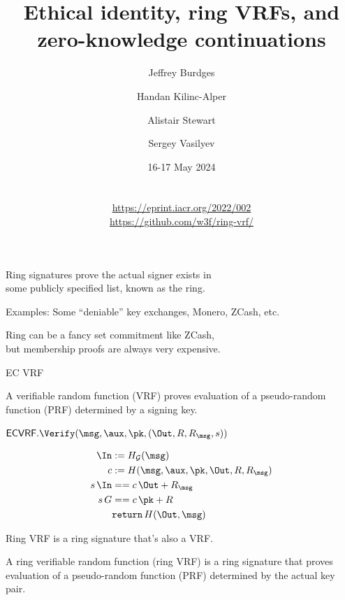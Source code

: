 \documentclass{beamer}
\title{Ethical identity, ring VRFs, and \\ zero-knowledge continuations}
\author{Jeffrey Burdges \and Handan Kilinc-Alper \and Alistair Stewart \and Sergey Vasilyev}
\date{16-17 May 2024 \\ \vphantom{|} \\ \vphantom{|} \\ \url{https://eprint.iacr.org/2022/002} \\ \url{https://github.com/w3f/ring-vrf/}}
\begin{document}
\maketitle





\begin{frame}
	
Ring signatures prove the actual signer exists in \\
\hspace{10pt} some publicly specified list, known as the ring.

\bigskip\bigskip

Examples:  Some ``deniable'' key exchanges, Monero, ZCash, etc.

\bigskip\bigskip

Ring can be a fancy set commitment like ZCash, \\
\hspace{10pt} but membership proofs are always very expensive.
	
\end{frame}



\begin{frame}{EC VRF}

A verifiable random function (VRF) proves evaluation of a pseudo-random function (PRF) determined by a signing key.

\bigskip\bigskip

$\mathsf{ECVRF}.\Verify(\msg,\aux,\pk,(\Out,R,R_\msg,s))$
	
$$ \begin{aligned}
\In &:= H_{\mathcal{G}}(\msg) \\
c &:= H(\msg,\aux,\pk,\Out,R,R_\msg) \\
s \, \In &== c \, \Out + R_\msg \\
s \, G &== c \, \pk + R \\
& \mathtt{return}\, H(\Out,\msg) \\
\end{aligned} $$
	
\end{frame}



\begin{frame}

Ring VRF is a ring signature that's also a VRF.

\bigskip\bigskip 

A ring verifiable random function (ring VRF) is a ring signature that proves evaluation of a pseudo-random function (PRF) determined by the actual key pair.

\end{frame}
\end{document}
